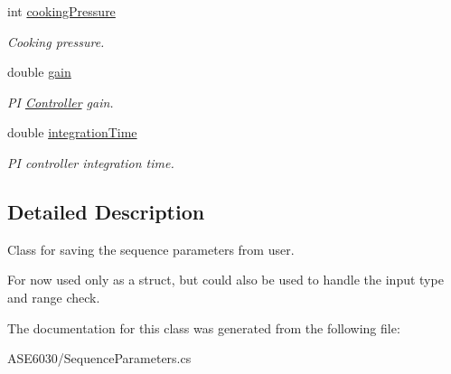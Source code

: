 \begin{DoxyCompactItemize}
int \hyperlink{class_a_s_e6030_1_1_sequence_parameters_a3541c0320c22637b3566458078f2865d}{cooking\+Pressure}
\begin{DoxyCompactList}\small\item\em Cooking pressure. \end{DoxyCompactList}\item 
\mbox{\label{class_a_s_e6030_1_1_sequence_parameters_a54ef8f65093e929f9ba6eee0531502f6}} 
double \hyperlink{class_a_s_e6030_1_1_sequence_parameters_a54ef8f65093e929f9ba6eee0531502f6}{gain}
\begin{DoxyCompactList}\small\item\em PI \hyperlink{class_a_s_e6030_1_1_controller}{Controller} gain. \end{DoxyCompactList}\item 
\mbox{\label{class_a_s_e6030_1_1_sequence_parameters_ad949634825a6ec898ea53e5483a6ba50}} 
double \hyperlink{class_a_s_e6030_1_1_sequence_parameters_ad949634825a6ec898ea53e5483a6ba50}{integration\+Time}
\begin{DoxyCompactList}\small\item\em PI controller integration time. \end{DoxyCompactList}\end{DoxyCompactItemize}


\subsection{Detailed Description}
Class for saving the sequence parameters from user. 

For now used only as a struct, but could also be used to handle the input type and range check. 

The documentation for this class was generated from the following file\+:\begin{DoxyCompactItemize}
\item 
A\+S\+E6030/Sequence\+Parameters.\+cs\end{DoxyCompactItemize}
